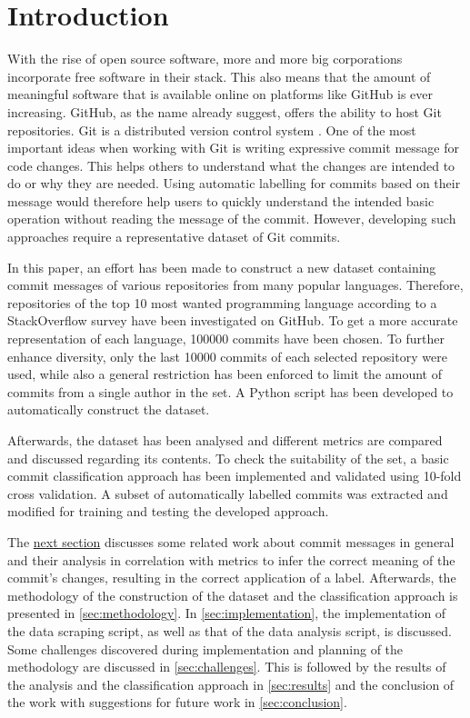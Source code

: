 \section{Introduction}
\label{sec:introduction}

With the rise of open source software, more and more big corporations
incorporate free software in their stack. This also means that the amount of
meaningful software that is available online on platforms like GitHub
\cite{github} is ever increasing. GitHub, as the name already suggest, offers
the ability to host Git repositories. Git is a distributed version control
system \cite{git}. One of the most important ideas when working with Git
is writing expressive commit message for code changes. This helps others
to understand what the changes are intended to do or why they are needed.
Using automatic labelling for commits based on their message would therefore
help users to quickly understand the intended basic operation without reading
the message of the commit. However, developing such approaches require a
representative dataset of Git commits.

In this paper, an effort has been made to construct a new dataset containing
commit messages of various repositories from many popular languages. Therefore,
repositories of the top 10 most wanted programming language according to
a StackOverflow survey \cite{so-survey} have been investigated on GitHub. To get a more accurate
representation of each language, 100000 commits have been chosen. To further
enhance diversity, only the last 10000 commits of each selected repository
were used, while also a general restriction has been enforced to limit the
amount of commits from a single author in the set. A Python script has been
developed to automatically construct the dataset.

Afterwards, the dataset has been analysed and different metrics are
compared and discussed regarding its contents. To check the
suitability of the set, a basic commit classification approach has been
implemented and validated using 10-fold cross validation. A subset of
automatically labelled commits was extracted and modified for training and
testing the developed approach.

The \hyperref[sec:related-work]{next section} discusses some related work about commit messages in
general and their analysis in correlation with metrics to infer the
correct meaning of the commit's changes, resulting in the correct application
of a label. Afterwards, the methodology of the
construction of the dataset and the classification approach is presented
in \autoref{sec:methodology}. In \autoref{sec:implementation}, the
implementation of the data scraping script, as well as that of the data analysis
script, is discussed. Some challenges discovered during implementation and
planning of the methodology are discussed in \autoref{sec:challenges}.
This is followed by the results of the analysis and
the classification approach in \autoref{sec:results} and the conclusion of the
work with suggestions for future work in \autoref{sec:conclusion}.
